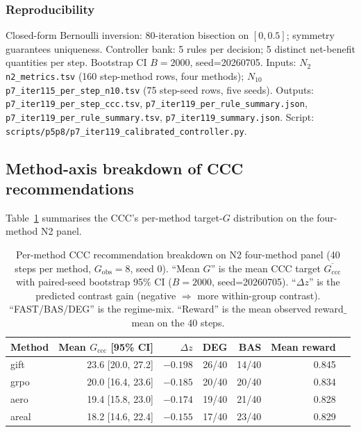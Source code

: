 \documentclass{article}
\begin{document}
\subsubsection*{Reproducibility}

Closed-form Bernoulli inversion: $80$-iteration bisection on
$[0, 0.5]$; symmetry guarantees uniqueness.
Controller bank: 5 rules per decision; 5 distinct net-benefit
quantities per step. Bootstrap CI $B=2000$, seed=20260705. Inputs:
$N_2$ \texttt{n2\_metrics.tsv} (160 step-method rows, four methods);
$N_{10}$ \texttt{p7\_iter115\_per\_step\_n10.tsv} (75 step-seed rows,
five seeds). Outputs: \texttt{p7\_iter119\_per\_step\_ccc.tsv},
\texttt{p7\_iter119\_per\_rule\_summary.json},
\texttt{p7\_iter119\_per\_rule\_summary.tsv},
\texttt{p7\_iter119\_summary.json}. Script:
\texttt{scripts/p5p8/p7\_iter119\_calibrated\_controller.py}.
 

\subsection*{Method-axis breakdown of CCC recommendations}

Table~\ref{tab:p7-method-axis-ccc} summarises the CCC's per-method
target-$G$ distribution on the four-method N2 panel.

\begin{table}[h]
\centering\small
\caption{Per-method CCC recommendation breakdown on N2 four-method panel
(40 steps per method, $G_{\mathrm{obs}}{=}8$, seed 0).  ``Mean $G$''
is the mean CCC target $\overline{G_{\mathrm{ccc}}}$ with paired-seed
bootstrap 95\% CI ($B{=}2000$, seed=20260705).  ``$\Delta z$'' is the
predicted contrast gain (negative $\Rightarrow$ more within-group
contrast).  ``FAST/BAS/DEG'' is the regime-mix.  ``Reward'' is the
mean observed reward$\_$mean on the 40 steps.}
\label{tab:p7-method-axis-ccc}
\begin{tabular}{lrrrrrr}
\toprule
Method & Mean $G_{\mathrm{ccc}}$ [95\% CI] & $\Delta z$ & DEG & BAS & Mean reward \\
\midrule
gift  & 23.6 [20.0, 27.2] & $-0.198$ & 26/40 & 14/40 & 0.845 \\
grpo  & 20.0 [16.4, 23.6] & $-0.185$ & 20/40 & 20/40 & 0.834 \\
aero  & 19.4 [15.8, 23.0] & $-0.174$ & 19/40 & 21/40 & 0.828 \\
areal & 18.2 [14.6, 22.4] & $-0.155$ & 17/40 & 23/40 & 0.829 \\
\bottomrule
\end{tabular}
\end{table}
\end{document}
